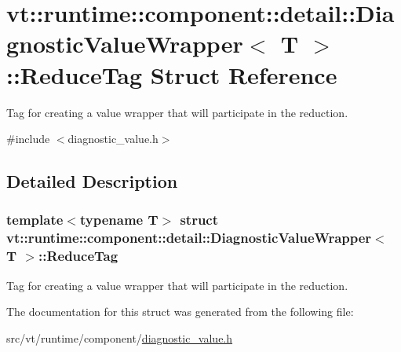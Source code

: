 \hypertarget{structvt_1_1runtime_1_1component_1_1detail_1_1_diagnostic_value_wrapper_1_1_reduce_tag}{}\section{vt\+:\+:runtime\+:\+:component\+:\+:detail\+:\+:Diagnostic\+Value\+Wrapper$<$ T $>$\+:\+:Reduce\+Tag Struct Reference}
\label{structvt_1_1runtime_1_1component_1_1detail_1_1_diagnostic_value_wrapper_1_1_reduce_tag}


Tag for creating a value wrapper that will participate in the reduction.  




{\ttfamily \#include $<$diagnostic\+\_\+value.\+h$>$}



\subsection{Detailed Description}
\subsubsection*{template$<$typename T$>$\newline
struct vt\+::runtime\+::component\+::detail\+::\+Diagnostic\+Value\+Wrapper$<$ T $>$\+::\+Reduce\+Tag}

Tag for creating a value wrapper that will participate in the reduction. 



The documentation for this struct was generated from the following file\+:\begin{DoxyCompactItemize}
\item 
src/vt/runtime/component/\hyperlink{diagnostic__value_8h}{diagnostic\+\_\+value.\+h}\end{DoxyCompactItemize}
